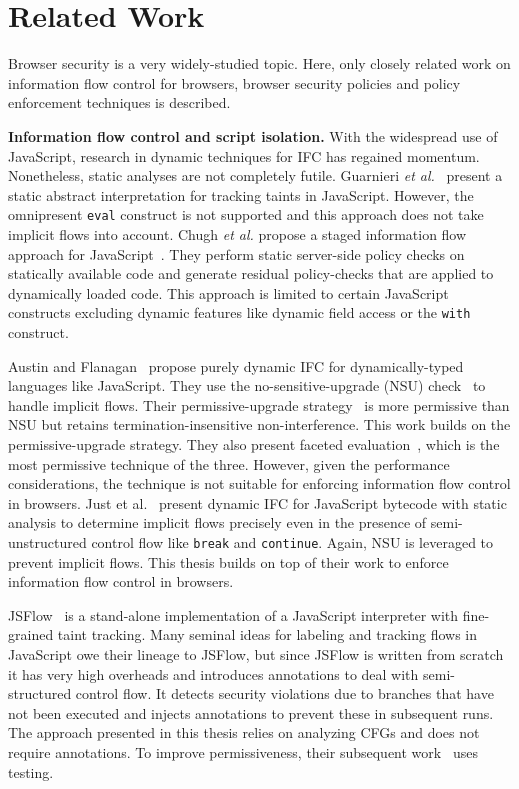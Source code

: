 \chapter{Related Work}
\label{ch:related}

Browser security is a very widely-studied topic. Here, only closely
related work on information flow control for browsers, browser
security policies and policy enforcement techniques is described. 

\medskip\noindent\textbf{Information flow control and script
  isolation.} With the widespread use of JavaScript,
research in dynamic techniques for IFC has regained momentum.
Nonetheless, static analyses are not completely futile. Guarn\-ieri
\emph{et al.}~\cite{guarnieri11ISSTA} present a static abstract
interpretation for tracking taints in JavaScript. However, the
omnipresent \texttt{eval} construct is not supported and this approach
does not take implicit flows into account.  Chugh \emph{et al.}
propose a staged information flow approach for 
JavaScript~\cite{stagedIFC}. They perform static server-side policy
checks on statically available code and generate residual
policy-checks that are applied to dynamically loaded code.  This
approach is limited to certain JavaScript constructs excluding dynamic 
features like dynamic field access or the \texttt{with} construct.

Austin and Flanagan~\cite{plas09} propose purely dynamic IFC for
dynamically-typed languages like JavaScript. They use the
no-sensitive-upgrade (NSU) check~\cite{zdancewic02PhD} to handle
implicit flows. Their per\-mis\-sive-upgrade strategy~\cite{plas10} is
more permissive than NSU but retains ter\-mi\-na\-tion-insensitive
non-interference. This work builds on the permissive-upgrade
strategy. They also present faceted evaluation~\cite{austin12POPL},
which is the most permissive technique of the three. However, given
the performance considerations, the technique is not suitable for
enforcing information flow control in browsers.  Just
et al.~\cite{just11PLASTIC} present dynamic IFC for JavaScript
bytecode with static analysis to determine implicit flows precisely
even in the presence of semi-unstructured control flow like
\texttt{break} and \texttt{continue}. Again, NSU is leveraged to
prevent implicit flows. This thesis builds on top of their work to
enforce information flow control in browsers.

JSFlow~\cite{csf12,jsflow} is a stand-alone implementation of
a JavaScript interpreter with fine-grained taint tracking. Many
seminal ideas for labeling and tracking flows in JavaScript owe their
lineage to JSFlow, but since JSFlow is written from scratch it has
very high overheads and  introduces annotations to deal with
semi-structured control flow. It detects
security violations due to branches that have not been executed and
injects annotations to prevent these in subsequent runs. The approach
presented in this thesis relies on analyzing CFGs and does not require
annotations. To improve permissiveness,
their subsequent work~\cite{esorics12} uses testing. 

